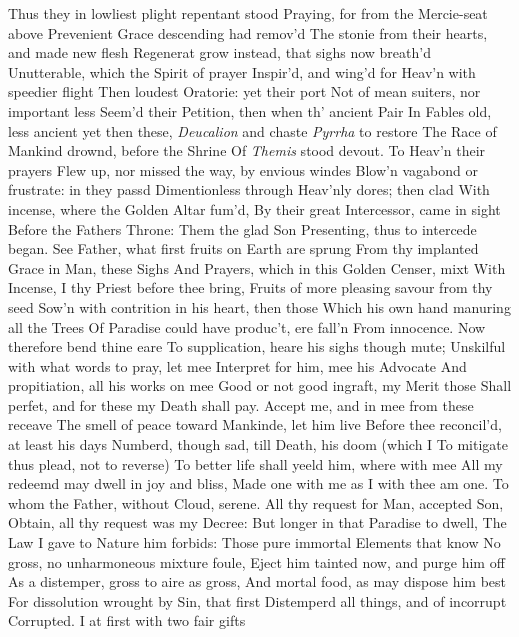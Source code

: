 \documentclass[11pt]{book}
\newcounter {first}
\begin{document}
 
\Book
 
Thus they in lowliest plight repentant stood 
Praying, for from the Mercie-seat above 
Prevenient Grace descending had remov'd 
The stonie from their hearts, and made new flesh 
Regenerat grow instead, that sighs now breath'd 
Unutterable, which the Spirit of prayer 
Inspir'd, and wing'd for Heav'n with speedier flight 
Then loudest Oratorie: yet their port 
Not of mean suiters, nor important less 
Seem'd their Petition, then when th' ancient Pair 
In Fables old, less ancient yet then these, 
\textit{Deucalion} and chaste \textit{Pyrrha} to restore 
The Race of Mankind drownd, before the Shrine 
Of \textit{Themis} stood devout.  To Heav'n their prayers 
Flew up, nor missed the way, by envious windes 
Blow'n vagabond or frustrate: in they passd 
Dimentionless through Heav'nly dores; then clad 
With incense, where the Golden Altar fum'd, 
By their great Intercessor, came in sight 
Before the Fathers Throne: Them the glad Son 
Presenting, thus to intercede began. 
\quad See Father, what first fruits on Earth are sprung 
From thy implanted Grace in Man, these Sighs 
And Prayers, which in this Golden Censer, mixt 
With Incense, I thy Priest before thee bring, 
Fruits of more pleasing savour from thy seed 
Sow'n with contrition in his heart, then those 
Which his own hand manuring all the Trees 
Of Paradise could have produc't, ere fall'n 
From innocence.  Now therefore bend thine eare 
To supplication, heare his sighs though mute; 
Unskilful with what words to pray, let mee 
Interpret for him, mee his Advocate 
And propitiation, all his works on mee 
Good or not good ingraft, my Merit those 
Shall perfet, and for these my Death shall pay. 
Accept me, and in mee from these receave 
The smell of peace toward Mankinde, let him live 
Before thee reconcil'd, at least his days 
Numberd, though sad, till Death, his doom (which I 
To mitigate thus plead, not to reverse) 
To better life shall yeeld him, where with mee 
All my redeemd may dwell in joy and bliss, 
Made one with me as I with thee am one. 
\quad To whom the Father, without Cloud, serene. 
All thy request for Man, accepted Son, 
Obtain, all thy request was my Decree: 
But longer in that Paradise to dwell, 
The Law I gave to Nature him forbids: 
Those pure immortal Elements that know 
No gross, no unharmoneous mixture foule, 
Eject him tainted now, and purge him off 
As a distemper, gross to aire as gross, 
And mortal food, as may dispose him best 
For dissolution wrought by Sin, that first 
Distemperd all things, and of incorrupt 
Corrupted.  I at first with two fair gifts 
\end{document}
